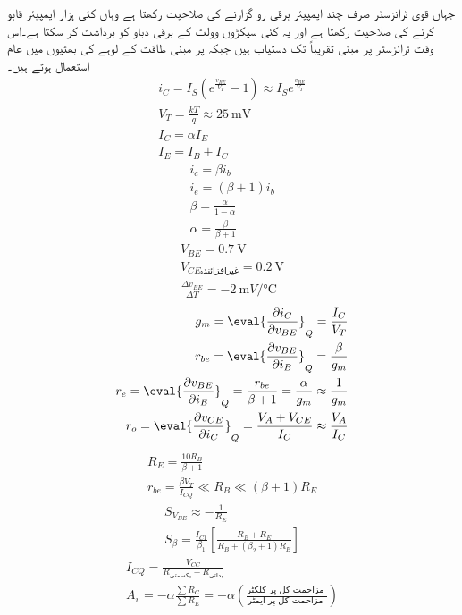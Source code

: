 جہاں قوی ٹرانزسٹر صرف چند ایمپیئر برقی رو گزارنے کی صلاحیت رکھتا ہے وہاں  کئی ہزار ایمپیئر قابو کرنے کی صلاحیت رکھتا ہے اور یہ کئی سیکڑوں وولٹ کے برقی دباو کو برداشت کر سکتا ہے۔اس وقت ٹرانزسٹر پر مبنی  تقریباً  تک دستیاب ہیں جبکہ  پر مبنی   طاقت کے لوہے کی بھٹیوں میں عام استعمال ہوتے ہیں۔
\newpage
{}
\begin{align*}
i_C=I_S \left(e^{\frac{v_{BE}}{V_T}} -1\right) \approx I_S e^{\frac{v_{BE}}{V_T}}\\
V_T =\frac{k T}{q} \approx \SI{25}{\milli \volt}\\
I_C=\alpha I_E\\
I_E=I_B+I_C
\end{align*}
%
\begin{align*}
i_c =\beta i_b\\
i_e=\left(\beta+1 \right) i_b\\
\beta=\frac{\alpha}{1-\alpha}\\
\alpha=\frac{\beta}{\beta+1}
\end{align*}
%
\begin{align*}
V_{BE}=\SI{0.7}{\volt}\\
V_{CE \textrm{غیرافزائندہ}}=\SI{0.2}{\volt}\\
\frac{\Delta v_{BE}}{\Delta T}=\SI[per=frac,fraction=nice]{-2}{ \milli V \per \celsius}
\end{align*}
%
\begin{align*}
g_m=\eval{\frac{\partial i_C}{\partial v_{BE}}}_{Q}=\frac{I_C}{V_T}\\
r_{be}=\eval{\frac{\partial v_{BE}}{\partial  i_B}}_{Q}=\frac{\beta}{g_m}\\
r_e=\eval{\frac{\partial v_{BE}}{\partial  i_E}}_{Q}=\frac{r_{be}}{\beta+1}=\frac{\alpha}{g_m}\approx \frac{1}{g_m}\\
r_o =\eval{\frac{\partial v_{CE}}{\partial  i_C}}_{Q}= \frac{V_A+V_{CE}}{I_C} \approx \frac{V_A}{I_C}
\end{align*}
%
\begin{align*}
R_E=\frac{10 R_B}{\beta+1}\\
r_{be} =\frac{\beta V_T}{I_{CQ}} \ll R_B \ll \left(\beta+1\right) R_E
\end{align*}
%
\begin{align*}
S_{V_{BE}} \approx -\frac{1}{R_E}\\
S_{\beta}=\frac{I_{C1}}{\beta_1} \left[\frac{R_B+R_E}{R_B+\left(\beta_2+1 \right)R_E} \right]
\end{align*}
%
\begin{align*}
I_{CQ}=\frac{V_{CC}}{R_{\textrm{یکسمتی}}+R_{\textrm{بدلتی}}}\\
A_v=-\alpha \frac{\sum R_C}{\sum R_E}=-\alpha \left(\frac{\textrm{مزاحمت کل پر کلکٹر }}{\textrm{مزاحمت کل پر ایمٹر }} \right)
\end{align*}

